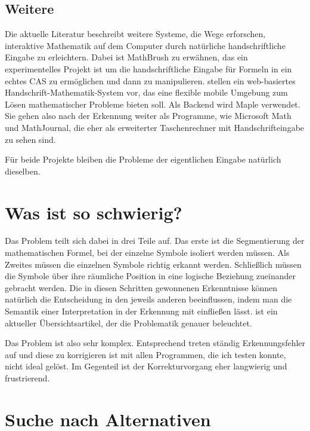 \subsection{Weitere}
\label{sub:mathbrush}

Die aktuelle Literatur beschreibt weitere Systeme, die Wege erforschen, interaktive Mathematik auf dem Computer durch natürliche handschriftliche Eingabe zu erleichtern. Dabei ist MathBrush \cite{Labahn:2008p10301} zu erwähnen, das ein experimentelles Projekt ist um die handschriftliche Eingabe für Formeln in ein echtes \ac{CAS} zu ermöglichen und dann zu manipulieren. \citet{Vuong:2010p10279} stellen ein web-basiertes Handschrift-Mathematik-System vor, das eine flexible mobile Umgebung zum Lösen mathematischer Probleme bieten soll. Als Backend wird Maple \cite{maple} verwendet. Sie gehen also nach der Erkennung weiter als Programme, wie Microsoft Math und MathJournal, die eher als erweiterter Taschenrechner mit Handschrifteingabe zu sehen sind.

Für beide Projekte bleiben die Probleme der eigentlichen Eingabe natürlich dieselben.

\section{Was ist so schwierig?}

Das Problem teilt sich dabei in drei Teile auf. Das erste ist die Segmentierung der mathematischen Formel, bei der einzelne Symbole isoliert werden müssen. Als Zweites müssen die einzelnen Symbole richtig erkannt werden. Schließlich müssen die Symbole über ihre räumliche Position in eine logische Beziehung zueinander gebracht werden. Die in diesen Schritten gewonnenen Erkenntnisse können natürlich die Entscheidung in den jeweils anderen beeinflussen, indem man die Semantik einer Interpretation in der Erkennung mit einfließen lässt. \cite{Tapia:2007p9160} ist ein aktueller Übersichtsartikel, der die Problematik genauer beleuchtet.

Das Problem ist also sehr komplex. Entsprechend treten ständig Erkennungsfehler auf und diese zu korrigieren ist mit allen Programmen, die ich testen konnte, nicht ideal gelöst. Im Gegenteil ist der Korrekturvorgang eher langwierig und frustrierend.

\section{Suche nach Alternativen}
\label{sec:alternativen}

